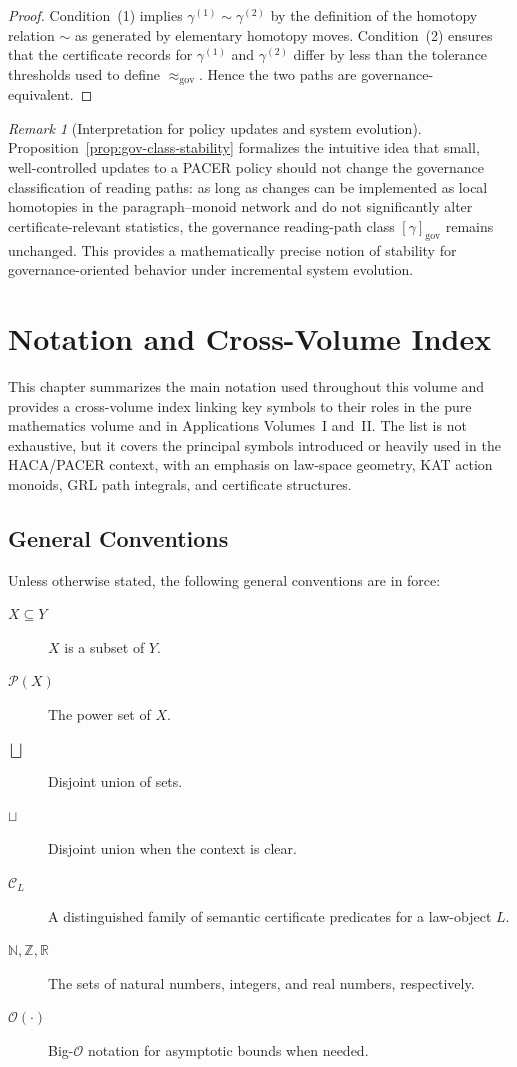 \documentclass[11pt]{book}
\theoremstyle{plain}
\theoremstyle{definition}
\theoremstyle{remark}
\newtheorem{remark}[theorem]{Remark}
\begin{document}
\begin{proof}
Condition~(1) implies $\gamma^{(1)}\sim\gamma^{(2)}$ by the definition
of the homotopy relation $\sim$ as generated by elementary homotopy
moves. Condition~(2) ensures that the certificate records for
$\gamma^{(1)}$ and $\gamma^{(2)}$ differ by less than the tolerance
thresholds used to define $\approx_{\mathrm{gov}}$. Hence the two
paths are governance-equivalent.
\end{proof}

\begin{remark}[Interpretation for policy updates and system evolution]
\label{rem:policy-update-interpretation}
Proposition~\ref{prop:gov-class-stability} formalizes the intuitive
idea that small, well-controlled updates to a PACER policy should not
change the governance classification of reading paths: as long as
changes can be implemented as local homotopies in the paragraph–monoid
network and do not significantly alter certificate-relevant statistics,
the governance reading-path class $[\gamma]_{\mathrm{gov}}$ remains
unchanged. This provides a mathematically precise notion of stability
for governance-oriented behavior under incremental system evolution.
\end{remark}



\chapter{Notation and Cross-Volume Index}


This chapter summarizes the main notation used throughout this volume
and provides a cross-volume index linking key symbols to their roles
in the pure mathematics volume and in Applications Volumes~I and~II.
The list is not exhaustive, but it covers the principal symbols
introduced or heavily used in the HACA/PACER context, with an
emphasis on law-space geometry, KAT action monoids, GRL path integrals,
and certificate structures.

\section*{General Conventions}

Unless otherwise stated, the following general conventions are in force:

\begin{description}
  \item[$X\subseteq Y$] $X$ is a subset of $Y$.
  \item[$\mathcal{P}(X)$] The power set of $X$.
  \item[$\bigsqcup$] Disjoint union of sets.
  \item[$\sqcup$] Disjoint union when the context is clear.
  \item[$\mathcal{C}_L$] A distinguished family of semantic certificate
        predicates for a law-object $L$.
  \item[$\mathbb{N},\mathbb{Z},\mathbb{R}$] The sets of natural numbers,
        integers, and real numbers, respectively.
  \item[$\mathcal{O}(\cdot)$] Big-$\mathcal{O}$ notation for asymptotic
        bounds when needed.
\end{description}
\end{document}
